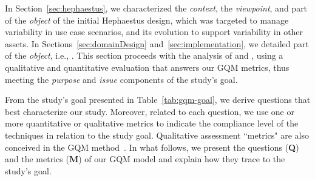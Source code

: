 In Section~\ref{sec:hephaestus}, we characterized the \emph{context}, the \emph{viewpoint}, and part of the \emph{object} of the initial Hephaestus design, which was targeted
to manage variability in use case scenarios, and its evolution to support variability in other assets.
In Sections~\ref{sec:domainDesign} and~\ref{sec:implementation}, we detailed part of the \emph{object}, i.e., \hpl.
This section proceeds with the analysis of \hpl{} and \hp{}, using a qualitative and quantitative evaluation that answers our GQM metrics, thus meeting the \emph{purpose} and \emph{issue} components of the study's goal.

From the study's goal presented in Table~\ref{tab:gqm-goal}, we derive questions that best characterize our study. Moreover,
related to each question, we use one or more quantitative or qualitative metrics to indicate the compliance level of the techniques in relation to
the study goal. Qualitative assessment ``metrics" are also conceived in the GQM method~\cite{gqm}.
In what follows, we present the questions (\textbf{Q}) and the metrics (\textbf{M}) of our GQM model and explain how they trace to the study's goal.

